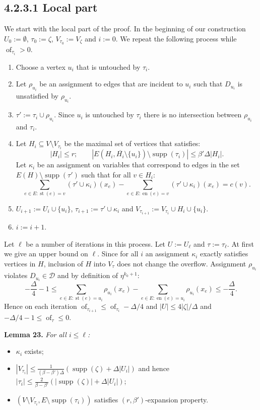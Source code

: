 \documentclass[10pt,a4paper]{article}
\newcommand{\supp}{\operatorname{supp}}
\newcommand{\st}{\operatorname{st}}
\newcommand{\en}{\operatorname{en}}
\newcommand{\of}{\operatorname{of}}
\newenvironment{result}[1]{\par\medskip\noindent\textbf{#1.}\itshape}{\par\medskip}
\begin{document}
\subsection*{4.2.3.1 Local part}
We start with the local part of the proof. In the beginning of our construction $U_0:=\emptyset$, $\tau_0:=\zeta$, $V_{\tau_0}:=V_\zeta$ and $i:=0$.
We repeat the following process while $\of_{\tau_i}>0$.
\begin{enumerate}
\item Choose a vertex $u_i$ that is untouched by $\tau_i$.
\item Let $\rho_{u_i}$ be an assignment to edges that are incident to $u_i$ such that $D_{u_i}$ is unsatisfied by $\rho_{u_i}$.
\item $\tau':=\tau_i\cup\rho_{u_i}$. Since $u_i$ is untouched by $\tau_i$ there is no intersection between $\rho_{u_i}$ and $\tau_i$.
\item Let $H_i\subseteq V\setminus V_{\tau_i}$ be the maximal set of vertices that satisfies:
\[|H_i|\le r;\qquad |E(H_i,\overline{H_i}\setminus\{u_i\})\setminus\supp(\tau_i)|\le\beta'\Delta|H_i|.\]
Let $\kappa_i$ be an assignment on variables that correspond to edges in the set $E(H)\setminus\supp(\tau')$ such that for all $v\in H_i$:
\[\sum_{e\in E:\st(e)=v}(\tau'\cup\kappa_i)(x_e)-\sum_{e\in E:\en(e)=v}(\tau'\cup\kappa_i)(x_e)=c(v).\]
\item $U_{i+1}:=U_i\cup\{u_i\}$, $\tau_{i+1}:=\tau'\cup\kappa_i$ and $V_{\tau_{i+1}}:=V_{\tau_i}\cup H_i\cup\{u_i\}$.
\item $i:=i+1$.
\end{enumerate}
Let $\ell$ be a number of iterations in this process. Let $U:=U_\ell$ and $\tau:=\tau_\ell$.
At first we give an upper bound on $\ell$. Since for all $i$ an assignment $\kappa_i$ exactly satisfies vertices in $H$, inclusion of $H$ into $V_\tau$ does not change the overflow. Assignment $\rho_{u_i}$ violates $D_{u_i}\in\mathcal D$ and by definition of $\eta^{k_0+1}$:
\[-\frac\Delta4-1\le\sum_{e\in E:\st(e)=u_i}\rho_{u_i}(x_e)-\sum_{e\in E:\en(e)=u_i}\rho_{u_i}(x_e)\le-\frac\Delta4.\]
Hence on each iteration $\of_{\tau_{i+1}}\le\of_{\tau_i}-\Delta/4$ and $|U|\le4|\zeta|/\Delta$ and $-\Delta/4-1\le\of_\tau\le0$.
\begin{result}{Lemma 23}
For all $i\le\ell$:
\begin{itemize}\item $\kappa_i$ exists;
\item $|V_{\tau_i}|\le\frac{1}{(\beta-\beta')\Delta}(\supp(\zeta)+\Delta|U_i|)$ and hence $|\tau_i|\le\frac{2}{\beta-\beta'}(|\supp(\zeta)|+\Delta|U_i|)$;
\item $(V\setminus V_{\tau_i},E\setminus\supp(\tau_i))$ satisfies $(r,\beta')$-expansion property.\end{itemize}
\end{result}
\end{document}
